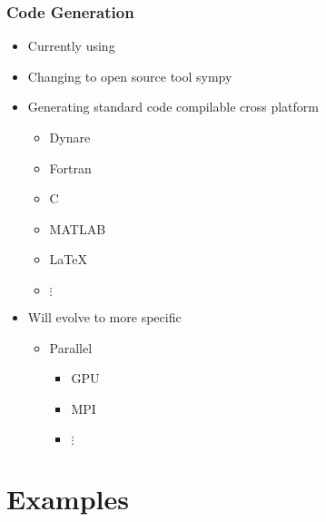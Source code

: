\documentclass[tikz]{beamer}
\begin{document}
\begin{frame}
  \frametitle{ Code Generation}
  


\begin{itemize}

\item Currently using \mma
\item Changing to open source tool  sympy 
\item Generating standard code compilable cross platform
  \begin{itemize}
 \item Dynare
\item Fortran
\item C
\item MATLAB
\item \LaTeX
\item $\vdots$
  \end{itemize}
\item Will evolve to more specific
  \begin{itemize}
  \item Parallel
    \begin{itemize}
  \item GPU
  \item MPI
  \item $\vdots$
    \end{itemize}
  \end{itemize}
\end{itemize}

\end{frame}



  


\section{Examples}
\end{document}
